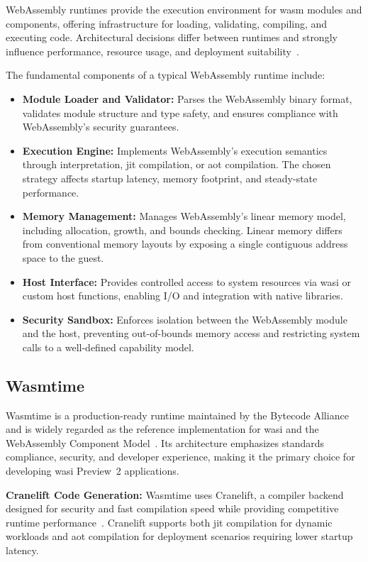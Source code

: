WebAssembly runtimes provide the execution environment for \acrshort{wasm} modules and components, offering infrastructure for loading, validating, compiling, and executing code. Architectural decisions differ between runtimes and strongly influence performance, resource usage, and deployment suitability~\cite{wasm_features_support}.

The fundamental components of a typical WebAssembly runtime include:

\begin{itemize}
    \item \textbf{Module Loader and Validator:} Parses the WebAssembly binary format, validates module structure and type safety, and ensures compliance with WebAssembly’s security guarantees.
    \item \textbf{Execution Engine:} Implements WebAssembly’s execution semantics through interpretation, \acrfull{jit} compilation, or \acrfull{aot} compilation. The chosen strategy affects startup latency, memory footprint, and steady-state performance.
    \item \textbf{Memory Management:} Manages WebAssembly’s linear memory model, including allocation, growth, and bounds checking. Linear memory differs from conventional memory layouts by exposing a single contiguous address space to the guest.
    \item \textbf{Host Interface:} Provides controlled access to system resources via \acrshort{wasi} or custom host functions, enabling I/O and integration with native libraries.
    \item \textbf{Security Sandbox:} Enforces isolation between the WebAssembly module and the host, preventing out-of-bounds memory access and restricting system calls to a well-defined capability model.
\end{itemize}

\subsection{Wasmtime}
\label{subsec:wasmtime}

Wasmtime is a production-ready runtime maintained by the Bytecode Alliance and is widely regarded as the reference implementation for \acrshort{wasi} and the WebAssembly Component Model~\cite{wasmtime_project}. Its architecture emphasizes standards compliance, security, and developer experience, making it the primary choice for developing \acrshort{wasi} Preview~2 applications.

\textbf{Cranelift Code Generation:} Wasmtime uses Cranelift, a compiler backend designed for security and fast compilation speed while providing competitive runtime performance~\cite{cranelift}. Cranelift supports both \acrshort{jit} compilation for dynamic workloads and \acrshort{aot} compilation for deployment scenarios requiring lower startup latency.

